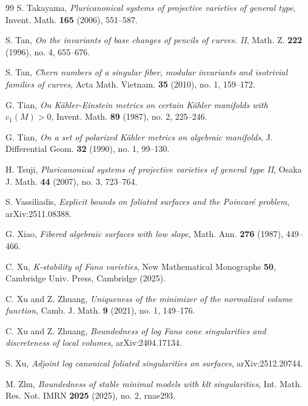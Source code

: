\documentclass[11pt,reqno]{amsart}
\numberwithin{equation}{section}
\theoremstyle{definition}
\begin{document}
\begin{thebibliography}{99}
 S. Takayama, \textit{Pluricanonical systems of projective varieties of general type}, Invent. Math. \textbf{165} (2006), 551--587.

 S. Tan, \textit{On the invariants of base changes of pencils of curves. II}, Math. Z. \textbf{222} (1996), no. 4, 655--676.

 S. Tan, \textit{Chern numbers of a singular fiber, modular invariants and isotrivial families of curves}, Acta Math. Vietnam. \textbf{35} (2010), no. 1, 159--172.

 G. Tian, \textit{On K\"ahler-Einstein metrics on certain K\"ahler manifolds with $c_1(M)>0$}, Invent. Math. \textbf{89} (1987), no. 2, 225--246.

 G. Tian, \textit{On a set of polarized K\"ahler metrics on algebraic manifolds}, J. Differential Geom. \textbf{32} (1990), no. 1, 99--130.

 H. Tsuji, \textit{Pluricanonical systems of projective varieties of general type II}, Osaka J. Math. \textbf{44} (2007), no. 3, 723--764.

 S. Vassiliadis, \textit{Explicit bounds on foliated surfaces and the Poincar\'e problem}, arXiv:2511.08388.

 G. Xiao, \textit{Fibered algebraic surfaces with low slope}, Math. Ann. \textbf{276} (1987), 449--466.

 C. Xu, \textit{K-stability of Fano varieties}, New Mathematical Monographs \textbf{50}, Cambridge Univ. Press, Cambridge (2025).

 C. Xu and Z. Zhuang, \textit{Uniqueness of the minimizer of the normalized volume function}, Camb. J. Math. \textbf{9} (2021), no. 1, 149--176.

 C. Xu and Z. Zhuang, \textit{Boundedness of log Fano cone singularities and discreteness of local volumes}, arXiv:2404.17134.

 S. Xu, \textit{Adjoint log canonical foliated singularities on surfaces}, arXiv:2512.20744.

 M. Zhu, \textit{Boundedness of stable minimal models with klt singularities}, Int. Math. Res. Not. IMRN \textbf{2025} (2025), no. 2, rnae293.
\end{thebibliography}
\endgroup
\end{document}
